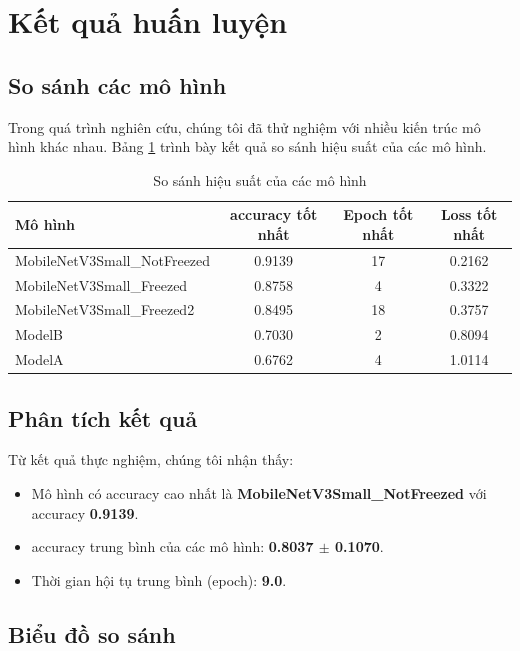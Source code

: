 
\section{Kết quả huấn luyện}

\subsection{So sánh các mô hình}

Trong quá trình nghiên cứu, chúng tôi đã thử nghiệm với nhiều kiến trúc mô hình khác nhau. 
Bảng \ref{tab:model_performance} trình bày kết quả so sánh hiệu suất của các mô hình.

\begin{table}[h]
\centering
\caption{So sánh hiệu suất của các mô hình}
\label{tab:model_performance}
\begin{tabular}{|l|c|c|c|}
\hline
\textbf{Mô hình} & \textbf{accuracy tốt nhất} & \textbf{Epoch tốt nhất} & \textbf{Loss tốt nhất} \\
\hline
MobileNetV3Small_NotFreezed & 0.9139 & 17 & 0.2162 \\
\hline
MobileNetV3Small_Freezed & 0.8758 & 4 & 0.3322 \\
\hline
MobileNetV3Small_Freezed2 & 0.8495 & 18 & 0.3757 \\
\hline
ModelB & 0.7030 & 2 & 0.8094 \\
\hline
ModelA & 0.6762 & 4 & 1.0114 \\
\hline

\end{tabular}
\end{table}

\subsection{Phân tích kết quả}


Từ kết quả thực nghiệm, chúng tôi nhận thấy:

\begin{itemize}
  \item Mô hình có accuracy cao nhất là \textbf{MobileNetV3Small_NotFreezed} với accuracy \textbf{0.9139}.
  \item accuracy trung bình của các mô hình: \textbf{0.8037 $\pm$ 0.1070}.
  \item Thời gian hội tụ trung bình (epoch): \textbf{9.0}.
\end{itemize}

\subsection{Biểu đồ so sánh}

